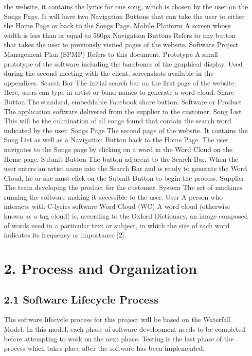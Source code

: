 \documentclass[]{article}
\begin{document}
the website, it contains the lyrics for one song, which is chosen by the
user on the Songs Page. It will have two Navigation Buttons that can
take the user to either the Home Page or back to the Songs Page. Mobile
Platform A screen whose width is less than or equal to 560px Navigation
Buttons Refers to any button that takes the user to previously visited
pages of the website. Software Project Management Plan (SPMP) Refers to
this document. Prototype A small prototype of the software including the
barebones of the graphical display. Used during the second meeting with
the client, screenshots available in the appendices. Search Bar The
initial search bar on the first page of the website. Here, users can
type in artist or band names to generate a word cloud. Share Button The
standard, embeddable Facebook share button. Software or Product The
application software delivered from the supplier to the customer. Song
List This will be the culmination of all songs found that contain the
search word indicated by the user. Songs Page The second page of the
website. It contains the Song List as well as a Navigation Button back
to the Home Page. The user navigates to the Songs page by clicking on a
word in the Word Cloud on the Home page. Submit Button The button
adjacent to the Search Bar. When the user enters an artist name into the
Search Bar and is ready to generate the Word Cloud, he or she must click
on the Submit Button to begin the process. Supplier The team developing
the product for the customer. System The set of machines running the
software making it accessible to the user. User A person who interacts
with C-lyrics software Word Cloud (WC) A word cloud (otherwise known as
a tag cloud) is, according to the Oxford Dictionary, an image composed
of words used in a particular text or subject, in which the size of each
word indicates its frequency or importance {[}2{]}.

\section{2. Process and Organization}\label{process-and-organization}

\subsection{2.1 Software Lifecycle
Process}\label{software-lifecycle-process}

The software lifecycle process for this project will be based on the
Waterfall Model. In this model, each phase of software development needs
to be completed before attempting to work on the next phase. Testing is
the last phase of the process which takes place after the software has
been implemented.
\end{document}
